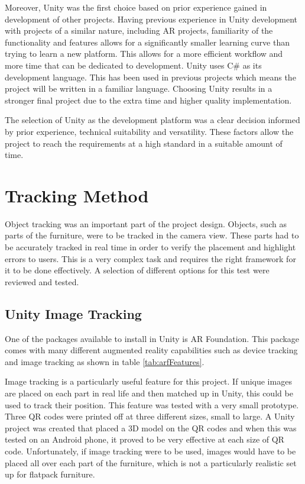 \documentclass{l4proj}
\begin{document}
Moreover, Unity was the first choice based on prior experience gained in development of other projects. Having previous experience in Unity development with projects of a similar nature, including AR projects, familiarity of the functionality and features allows for a significantly smaller learning curve than trying to learn a new platform. This allows for a more efficient workflow and more time that can be dedicated to development. Unity uses C# as its development language. This has been used in previous projects which means the project will be written in a familiar language. Choosing Unity results in a stronger final project due to the extra time and higher quality implementation.

The selection of Unity as the development platform was a clear decision informed by prior experience, technical suitability and versatility. These factors allow the project to reach the requirements at a high standard in a suitable amount of time.

\section{Tracking Method}

Object tracking was an important part of the project design. Objects, such as parts of the furniture, were to be tracked in the camera view. These parts had to be accurately tracked in real time in order to verify the placement and highlight errors to users. This is a very complex task and requires the right framework for it to be done effectively. A selection of different options for this test were reviewed and tested.

\subsection{Unity Image Tracking}

One of the packages available to install in Unity is AR Foundation. This package comes with many different augmented reality capabilities such as device tracking and image tracking as shown in table \ref{tab:arfFeatures}. 

Image tracking is a particularly useful feature for this project. If unique images are placed on each part in real life and then matched up in Unity, this could be used to track their position. This feature was tested with a very small prototype. Three QR codes were printed off at three different sizes, small to large. A Unity project was created that placed a 3D model on the QR codes and when this was tested on an Android phone, it proved to be very effective at each size of QR code. Unfortunately, if image tracking were to be used, images would have to be placed all over each part of the furniture, which is not a particularly realistic set up for flatpack furniture.
\end{document}
